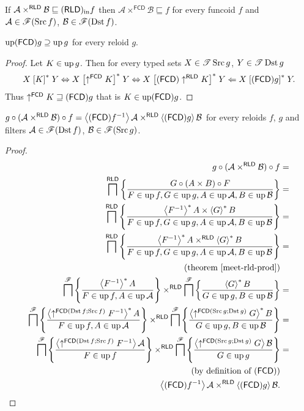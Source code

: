 \begin{conjecture}
If $\mathcal{A}\times^{\mathsf{RLD}}\mathcal{B}\sqsubseteq(\mathsf{RLD})_{\mathrm{in}} f$
then $\mathcal{A}\times^{\mathsf{FCD}}\mathcal{B}\sqsubseteq f$ for
every funcoid $f$ and $\mathcal{A}\in\mathscr{F}(\operatorname{Src} f)$, $\mathcal{B}\in\mathscr{F}(\operatorname{Dst} f)$.\end{conjecture}
\begin{thm}
$\operatorname{up}(\mathsf{FCD}) g\supseteq\operatorname{up} g$ for every reloid $g$.\end{thm}
\begin{proof}
Let $K\in\operatorname{up} g$. Then for every typed sets $X\in\mathscr{T}\operatorname{Src} g$, $Y\in\mathscr{T}\operatorname{Dst} g$
\[
X\mathrel{\left[K\right]^{\ast}}Y\Leftrightarrow X\mathrel{\left[\uparrow^{\mathsf{FCD}}K\right]^{\ast}}Y\Leftrightarrow X\mathrel{\left[(\mathsf{FCD})\uparrow^{\mathsf{RLD}}K\right]^{\ast}}Y\Leftarrow X\mathrel{\left[(\mathsf{FCD}) g\right]^{\ast}}Y.
\]
Thus $\uparrow^{\mathsf{FCD}}K\sqsupseteq(\mathsf{FCD}) g$ that is $K\in\operatorname{up}(\mathsf{FCD}) g$.\end{proof}
\begin{thm}
$g\circ(\mathcal{A}\times^{\mathsf{RLD}}\mathcal{B})\circ f=\left\langle (\mathsf{FCD}) f^{-1}\right\rangle\mathcal{A}\times^{\mathsf{RLD}}\left\langle (\mathsf{FCD}) g\right\rangle\mathcal{B}$
for every reloids $f$, $g$ and filters $\mathcal{A}\in\mathscr{F}(\operatorname{Dst} f)$,
$\mathcal{B}\in\mathscr{F}(\operatorname{Src} g)$.\end{thm}
\begin{proof}
~
\begin{align*}
g\circ(\mathcal{A}\times^{\mathsf{RLD}}\mathcal{B})\circ f & =\\
\bigsqcap^{\mathsf{RLD}}\setcond{G\circ(A\times B)\circ F}{F\in\up f,G\in\up g,A\in\up\mathcal{A},B\in\up\mathcal{B}} & =\\
\bigsqcap^{\mathsf{RLD}}\setcond{\rsupfun{F^{-1}}A\times\rsupfun GB}{F\in\up f,G\in\up g,A\in\up\mathcal{A},B\in\up\mathcal{B}} & =\\
\bigsqcap^{\mathsf{RLD}}\setcond{\rsupfun{F^{-1}}A\times^{\mathsf{RLD}}\rsupfun GB}{F\in\up f,G\in\up g,A\in\up\mathcal{A},B\in\up\mathcal{B}} & =\\
\text{(theorem \ref{meet-rld-prod})}\\
\bigsqcap^{\mathscr{F}}\setcond{\rsupfun{F^{-1}}A}{F\in\up f,A\in\up\mathcal{A}}\times^{\mathsf{RLD}}\bigsqcap^{\mathscr{F}}\setcond{\rsupfun GB}{G\in\up g,B\in\up\mathcal{B}} & =\\
\bigsqcap^{\mathscr{F}}\setcond{\rsupfun{\uparrow^{\mathsf{FCD}(\Dst f;\Src f)}F^{-1}}A}{F\in\up f,A\in\up\mathcal{A}}\times^{\mathsf{RLD}}\bigsqcap^{\mathscr{F}}\setcond{\rsupfun{\uparrow^{\mathsf{FCD}(\Src g;\Dst g)}G}B}{G\in\up g,B\in\up\mathcal{B}} & =\\
\bigsqcap^{\mathscr{F}}\setcond{\supfun{\uparrow^{\mathsf{FCD}(\Dst f;\Src f)}F^{-1}}\mathcal{A}}{F\in\up f}\times^{\mathsf{RLD}}\bigsqcap^{\mathscr{F}}\setcond{\supfun{\uparrow^{\mathsf{FCD}(\Src g;\Dst g)}G}\mathcal{B}}{G\in\up g} & =\\
\text{(by definition of \ensuremath{\tofcd})} & \text{}\\
\supfun{\tofcd f^{-1}}\mathcal{A}\times^{\mathsf{RLD}}\supfun{\tofcd g}\mathcal{B}.
\end{align*}
\end{proof}
